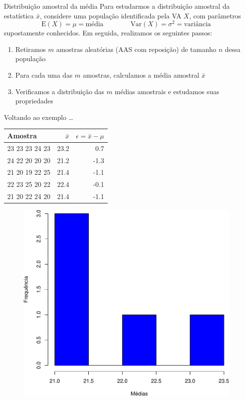 \documentclass[10pt]{beamer}\usepackage[]{graphicx}\usepackage[]{color}
\providecommand{\E}{\text{E}}
\providecommand{\Var}{\text{Var}}
\theoremstyle{definition}
\begin{document}
\begin{frame}[fragile=singleslide]{Distribuição amostral da média}
  Para estudarmos a distribuição amostral da estatística $\bar{x}$,
  considere uma população identificada pela VA $X$, com parâmetros
  \begin{equation*}
    \E(X) = \mu = \text{média} \qquad \qquad \Var(X) = \sigma^2 =
    \text{variância}
  \end{equation*}
  supostamente conhecidos. Em seguida, realizamos os seguintes passos:
  \begin{enumerate}
  \item Retiramos $m$ amostras aleatórias (AAS com reposição) de tamanho
    $n$ dessa população
  \item Para cada uma das $m$ amostras, calculamos a média amostral
    $\bar{x}$
  \item Verificamos a distribuição das $m$ médias amostrais e estudamos
    suas propriedades
  \end{enumerate}
\end{frame}

\begin{frame}{Voltando ao exemplo \ldots}
  \begin{table}[h]
    \centering
    \small
    \begin{tabular}{lrr}
      \hline
      Amostra & $\bar{x}$ & $\epsilon = \bar{x} - \mu$ \\
      \hline
      23 23 23 24 23 & 23.2 & 0.7 \\
      24 22 20 20 20 & 21.2 & -1.3 \\
      21 20 19 22 25 & 21.4 & -1.1 \\
      22 23 25 20 22 & 22.4 & -0.1 \\
      21 20 22 24 20 & 21.4 & -1.1 \\
      \hline
    \end{tabular}
  \end{table}
  \begin{figure}[h]
    \centering
    \includegraphics[width=.5\textwidth]{hist-crop}
  \end{figure}
\end{frame}
\end{document}
